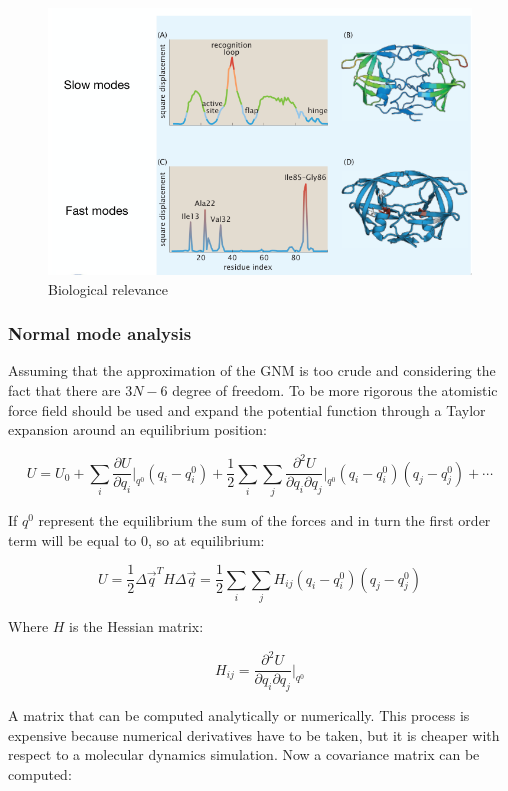 		\begin{figure}[H]
			\includegraphics[width=\textwidth]{biological-relevance}
			\caption{Biological relevance}
			\label{fig:biological-relevance}
		\end{figure}

		\subsubsection{Normal mode analysis}
		Assuming that the approximation of the GNM is too crude and considering the fact that there are $3N-6$ degree of freedom.
		To be more rigorous the atomistic force field should be used and expand the potential function through a Taylor expansion around an equilibrium position:

		$$U = U_0 + \sum\limits_i\frac{\partial U}{\partial q_i}\biggr\rvert_{q^0}(q_i-q_i^0) + \frac{1}{2}\sum\limits_i\sum\limits_j\frac{\partial^2 U}{\partial q_i\partial q_j}\biggr\rvert_{q^0}(q_i-q_i^0)(q_j-q_j^0) + \cdots$$

		If $q^0$ represent the equilibrium the sum of the forces and in turn the first order term will be equal to $0$, so at equilibrium:

		$$U = \frac{1}{2}\Delta\vec{q}^TH\Delta\vec{q} = \frac{1}{2}\sum\limits_i\sum\limits_j H_{ij}(q_i-q_i^0)(q_j-q_j^0)$$

		Where $H$ is the Hessian matrix:

		$$H_{ij} = \frac{\partial^2 U}{\partial q_i\partial q_j}\biggr\rvert_{q^0}$$

		A matrix that can be computed analytically or numerically.
		This process is expensive because numerical derivatives have to be taken, but it is cheaper with respect to a molecular dynamics simulation.
		Now a covariance matrix can be computed:

